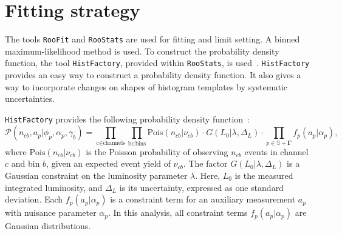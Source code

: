 \section{Fitting strategy}
The tools \texttt{RooFit} and \texttt{RooStats} are used for fitting and limit setting.
A binned maximum-likelihood method is used.
To construct the probability density function, the tool \texttt{HistFactory}, provided within \texttt{RooStats}, is used~\cite{HistFactory}.
\texttt{HistFactory} provides an easy way to construct a probability density function.
It also gives a way to incorporate changes on shapes of histogram templates by systematic uncertainties.

\texttt{HistFactory} provides the following probability density function~\cite{HistFactory}:
\begin{equation}
    \mathcal{P}(n_{cb}, a_{p}|\phi_{p},\alpha_{p},\gamma_{b}) = \prod_{\textrm{c}\in \textrm{channels}} \prod_{\textrm{b}\in \textrm{bins}} \textrm{Pois}(n_{cb}|\nu_{cb}) \cdot G(L_{0}|\lambda, \Delta_{L}) \cdot \prod_{p\in \mathbb{S}+\boldsymbol{\Gamma}} f_{p}(a_{p}|\alpha_{p}),
\end{equation}
where $\textrm{Pois}(n_{cb}|\nu_{cb})$ is the Poisson probability of observing $n_{cb}$ events in channel $c$ and bin $b$, given an expected event yield of $\nu_{cb}$.
The factor $G(L_{0}|\lambda,\Delta_{L})$ is a Gaussian constraint on the luminosity parameter $\lambda$.
Here, $L_{0}$ is the measured integrated luminosity, and $\Delta_{L}$ is its uncertainty, expressed as one standard deviation.
Each $f_{p}(a_{p}|\alpha_{p})$ is a constraint term for an auxiliary measurement $a_{p}$ with nuisance parameter $\alpha_{p}$.
In this analysis, all constraint terms $f_{p}(a_{p}|\alpha_{p})$ are Gaussian distributions.

